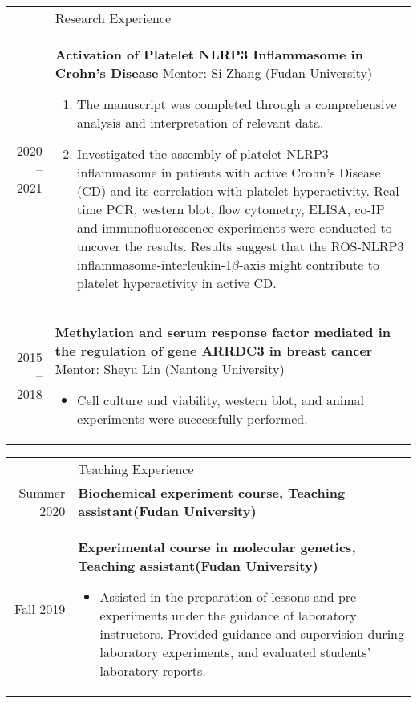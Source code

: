\documentclass[letterpaper, 11pt]{article}
\newcommand{\headingfont}{\Large\color{LimeGreen}}
\newenvironment{SectionTable}[1]{
	\renewcommand*{\arraystretch}{1.7}
	\setlength{\tabcolsep}{10pt}
	\begin{longtable}{Rp{5.2in}} & #1 \\}
{\end{longtable}\vspace{-.3cm}}
\begin{document}
\begin{SectionTable}{\headingfont Research Experience}
2020 -- 2021 &
\textbf{Activation of Platelet NLRP3 Inflammasome in Crohn's Disease} \newline
Mentor: Si Zhang (Fudan University) 
\begin{enumerate}
	\item The manuscript was completed through a comprehensive analysis and interpretation of relevant data.
	\item Investigated the assembly of platelet NLRP3 inflammasome in patients with active Crohn's Disease (CD) and its correlation with platelet hyperactivity. Real-time PCR, western blot, flow cytometry, ELISA, co-IP and immunofluorescence experiments were conducted to uncover the results. Results suggest that the ROS-NLRP3 inflammasome-interleukin-1$\beta$-axis might contribute to platelet hyperactivity in active CD. 
\end{enumerate}  \\

2015 -- 2018 &
\textbf{Methylation and serum response factor mediated in the regulation of gene ARRDC3 in breast cancer} \newline
Mentor: Sheyu Lin (Nantong University)
\begin{itemize}
	\item Cell culture and viability, western blot, and animal experiments were successfully performed.
\end{itemize}
\end{SectionTable}


\begin{SectionTable}{\headingfont Teaching Experience}
Summer  2020 & 
\textbf{Biochemical experiment course, Teaching assistant(Fudan University)} \\

Fall 2019 & 
\textbf{Experimental course in molecular genetics, Teaching assistant(Fudan University)}
\begin{itemize}
	\item Assisted in the preparation of lessons and pre-experiments under the guidance of laboratory instructors. Provided guidance and supervision during laboratory experiments, and evaluated students' laboratory reports. 
\end{itemize}
\end{SectionTable}

\end{document}
